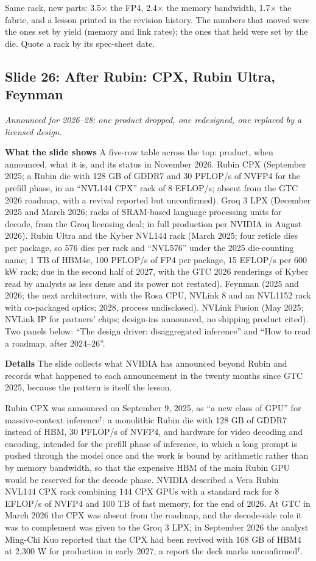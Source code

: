\documentclass[11pt,letterpaper]{article}
\newcommand{\slide}[3]{%
  \subsection[Slide #1: #2]{Slide #1: #2}%
  {\color{muted}\itshape #3\par}\medskip}
\newcommand{\para}[1]{\medskip\noindent\textbf{#1}\quad}
\newenvironment{intuition}{\begin{tcolorbox}[intuitionbox]}{\end{tcolorbox}}
\begin{document}
\begin{intuition}
Same rack, new parts: 3.5$\times$ the FP4, 2.4$\times$ the memory bandwidth, 1.7$\times$ the fabric, and a lesson printed in the revision history. The numbers that moved were the ones set by yield (memory and link rates); the ones that held were set by the die. Quote a rack by its spec-sheet date.
\end{intuition}


\slide{26}{After Rubin: CPX, Rubin Ultra, Feynman}{Announced for 2026--28: one product dropped, one redesigned, one replaced by a licensed design.}

\para{What the slide shows} A five-row table across the top: product, when announced, what it is, and its status in November 2026. Rubin CPX (September 2025; a Rubin die with 128 GB of GDDR7 and 30 PFLOP/s of NVFP4 for the prefill phase, in an ``NVL144 CPX'' rack of 8 EFLOP/s; absent from the GTC 2026 roadmap, with a revival reported but unconfirmed). Groq 3 LPX (December 2025 and March 2026; racks of SRAM-based language processing units for decode, from the Groq licensing deal; in full production per NVIDIA in August 2026). Rubin Ultra and the Kyber NVL144 rack (March 2025; four reticle dies per package, so 576 dies per rack and ``NVL576'' under the 2025 die-counting name; 1 TB of HBM4e, 100 PFLOP/s of FP4 per package, 15 EFLOP/s per 600 kW rack; due in the second half of 2027, with the GTC 2026 renderings of Kyber read by analysts as less dense and its power not restated). Feynman (2025 and 2026; the next architecture, with the Rosa CPU, NVLink 8 and an NVL1152 rack with co-packaged optics; 2028, process undisclosed). NVLink Fusion (May 2025; NVLink IP for partners' chips; design-ins announced, no shipping product cited). Two panels below: ``The design driver: disaggregated inference'' and ``How to read a roadmap, after 2024--26''.

\para{Details} The slide collects what NVIDIA has announced beyond Rubin and records what happened to each announcement in the twenty months since GTC 2025, because the pattern is itself the lesson.

Rubin CPX was announced on September 9, 2025, as ``a new class of GPU'' for massive-context inference$^\dagger$: a monolithic Rubin die with 128 GB of GDDR7 instead of HBM, 30 PFLOP/s of NVFP4, and hardware for video decoding and encoding, intended for the prefill phase of inference, in which a long prompt is pushed through the model once and the work is bound by arithmetic rather than by memory bandwidth, so that the expensive HBM of the main Rubin GPU would be reserved for the decode phase. NVIDIA described a Vera Rubin NVL144 CPX rack combining 144 CPX GPUs with a standard rack for 8 EFLOP/s of NVFP4 and 100 TB of fast memory, for the end of 2026. At GTC in March 2026 the CPX was absent from the roadmap, and the decode-side role it was to complement was given to the Groq 3 LPX; in September 2026 the analyst Ming-Chi Kuo reported that the CPX had been revived with 168 GB of HBM4 at 2{,}300 W for production in early 2027, a report the deck marks unconfirmed$^\dagger$.
\end{document}
